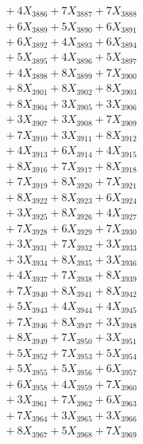 \documentclass[a4paper,10pt]{article}
\begin{document}
{\begin{align}
&\;  + 4 X_{3886} + 7 X_{3887} + 7 X_{3888} \\[0.3ex]
&\;  + 6 X_{3889} + 5 X_{3890} + 6 X_{3891} \\[0.3ex]
&\;  + 6 X_{3892} + 4 X_{3893} + 6 X_{3894} \\[0.3ex]
&\;  + 5 X_{3895} + 4 X_{3896} + 5 X_{3897} \\[0.3ex]
&\;  + 4 X_{3898} + 8 X_{3899} + 7 X_{3900} \\[0.3ex]
&\;  + 8 X_{3901} + 8 X_{3902} + 8 X_{3903} \\[0.3ex]
&\;  + 8 X_{3904} + 3 X_{3905} + 3 X_{3906} \\[0.3ex]
&\;  + 3 X_{3907} + 3 X_{3908} + 7 X_{3909} \\[0.5ex]\allowbreak
&\;  + 7 X_{3910} + 3 X_{3911} + 8 X_{3912} \\[0.3ex]
&\;  + 4 X_{3913} + 6 X_{3914} + 4 X_{3915} \\[0.3ex]
&\;  + 8 X_{3916} + 7 X_{3917} + 8 X_{3918} \\[0.3ex]
&\;  + 7 X_{3919} + 8 X_{3920} + 7 X_{3921} \\[0.3ex]
&\;  + 8 X_{3922} + 8 X_{3923} + 6 X_{3924} \\[0.3ex]
&\;  + 3 X_{3925} + 8 X_{3926} + 4 X_{3927} \\[0.3ex]
&\;  + 7 X_{3928} + 6 X_{3929} + 7 X_{3930} \\[0.3ex]
&\;  + 3 X_{3931} + 7 X_{3932} + 3 X_{3933} \\[0.3ex]
&\;  + 3 X_{3934} + 8 X_{3935} + 3 X_{3936} \\[0.3ex]
&\;  + 4 X_{3937} + 7 X_{3938} + 8 X_{3939} \\[0.5ex]\allowbreak
&\;  + 7 X_{3940} + 8 X_{3941} + 8 X_{3942} \\[0.3ex]
&\;  + 5 X_{3943} + 4 X_{3944} + 4 X_{3945} \\[0.3ex]
&\;  + 7 X_{3946} + 8 X_{3947} + 3 X_{3948} \\[0.3ex]
&\;  + 8 X_{3949} + 7 X_{3950} + 3 X_{3951} \\[0.3ex]
&\;  + 5 X_{3952} + 7 X_{3953} + 5 X_{3954} \\[0.3ex]
&\;  + 5 X_{3955} + 5 X_{3956} + 6 X_{3957} \\[0.3ex]
&\;  + 6 X_{3958} + 4 X_{3959} + 7 X_{3960} \\[0.3ex]
&\;  + 3 X_{3961} + 7 X_{3962} + 6 X_{3963} \\[0.3ex]
&\;  + 7 X_{3964} + 3 X_{3965} + 3 X_{3966} \\[0.3ex]
&\;  + 8 X_{3967} + 5 X_{3968} + 7 X_{3969} \\[0.5ex]\allowbreak

\end{align}}
\end{document}
